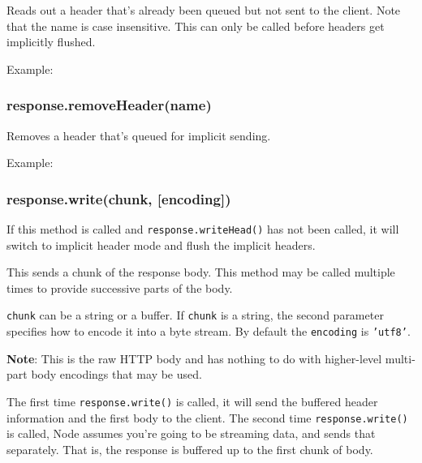 Reads out a header that's already been queued but not sent to the
client. Note that the name is case insensitive. This can only be called
before headers get implicitly flushed.

Example:

\begin{Shaded}
\begin{Highlighting}[]
 \NormalTok{(}\NormalTok{);}
\end{Highlighting}
\end{Shaded}

\subsubsection{response.removeHeader(name)}

Removes a header that's queued for implicit sending.

Example:

\begin{Shaded}
\begin{Highlighting}[]
\NormalTok{(}\NormalTok{);}
\end{Highlighting}
\end{Shaded}

\subsubsection{response.write(chunk, {[}encoding{]})}

If this method is called and \texttt{response.writeHead()} has not been
called, it will switch to implicit header mode and flush the implicit
headers.

This sends a chunk of the response body. This method may be called
multiple times to provide successive parts of the body.

\texttt{chunk} can be a string or a buffer. If \texttt{chunk} is a
string, the second parameter specifies how to encode it into a byte
stream. By default the \texttt{encoding} is \texttt{'utf8'}.

\textbf{Note}: This is the raw HTTP body and has nothing to do with
higher-level multi-part body encodings that may be used.

The first time \texttt{response.write()} is called, it will send the
buffered header information and the first body to the client. The second
time \texttt{response.write()} is called, Node assumes you're going to
be streaming data, and sends that separately. That is, the response is
buffered up to the first chunk of body.

